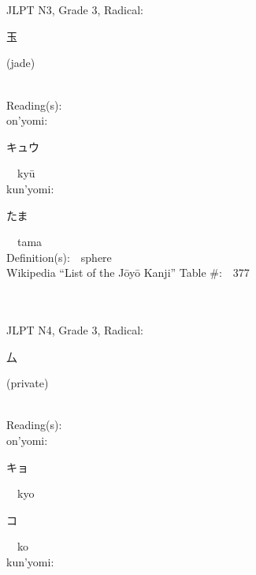 \begin{multicols}{2}
\ \ \\
{\fontsize{34pt}{40pt}  }\ \ \\  %
{JLPT N3, Grade 3, Radical:\ \ {\begin{CJK}{UTF8}{min} 玉 \end{CJK}} (jade) } \\
Reading(s):\ \ \\
{\hspace*{1em}}on'yomi:\ \ \\
{\hspace*{2em}}{\begin{CJK}{UTF8}{min} キュウ \end{CJK}}\ \ ky\=u\ \ \\
{\hspace*{1em}}kun'yomi:\ \ \\
{\hspace*{2em}}{\begin{CJK}{UTF8}{min} たま \end{CJK}}\ \ tama\ \ \\
Definition(s):\ \ sphere \\
Wikipedia ``List of the J\=oy\=o Kanji'' Table \#:\ \ 377 \\
\ \ \\
{\fontsize{34pt}{40pt}  }\ \ \\  %
{JLPT N4, Grade 3, Radical:\ \ {\begin{CJK}{UTF8}{min} 厶 \end{CJK}} (private) } \\
Reading(s):\ \ \\
{\hspace*{1em}}on'yomi:\ \ \\
{\hspace*{2em}}{\begin{CJK}{UTF8}{min} キョ \end{CJK}}\ \ kyo\ \ \\
{\hspace*{2em}}{\begin{CJK}{UTF8}{min} コ \end{CJK}}\ \ ko\ \ \\
{\hspace*{1em}}kun'yomi:\ \ \\

\end{multicols}
